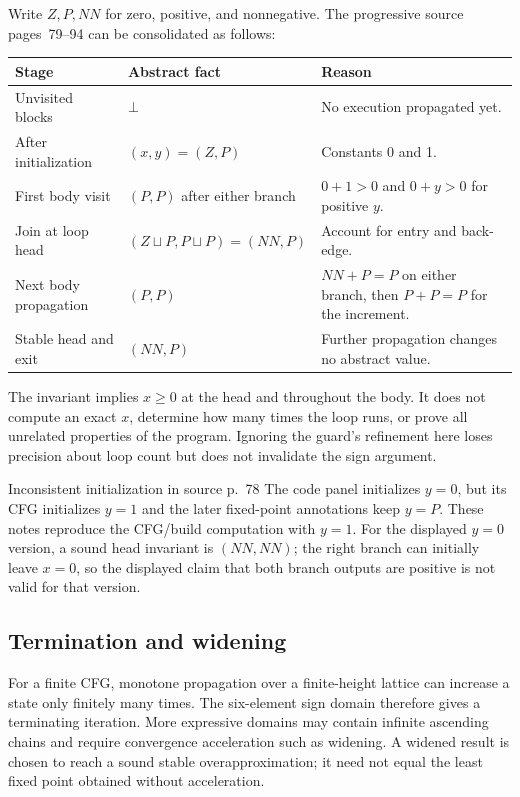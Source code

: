 \documentclass[11pt,a4paper]{article}
\numberwithin{figure}{section}
\begin{document}
Write $Z,P,NN$ for zero, positive, and nonnegative. The progressive source pages~79--94 can be consolidated as follows:
\par\noindent\begin{tabularx}{\linewidth}{@{}>{\raggedright\arraybackslash}p{30mm}>{\raggedright\arraybackslash}p{54mm}Y@{}}\toprule
Stage & Abstract fact & Reason\\\midrule
Unvisited blocks & $\bot$ & No execution propagated yet.\\
After initialization & $(x,y)=(Z,P)$ & Constants 0 and 1.\\
First body visit & $(P,P)$ after either branch & $0+1>0$ and $0+y>0$ for positive $y$.\\
Join at loop head & $(Z\sqcup P,P\sqcup P)=(NN,P)$ & Account for entry and back-edge.\\
Next body propagation & $(P,P)$ & $NN+P=P$ on either branch, then $P+P=P$ for the increment.\\
Stable head and exit & $(NN,P)$ & Further propagation changes no abstract value.\\\bottomrule
\end{tabularx}\par

The invariant implies $x\ge0$ at the head and throughout the body. It does not compute an exact $x$, determine how many times the loop runs, or prove all unrelated properties of the program. Ignoring the guard's refinement here loses precision about loop count but does not invalidate the sign argument.

\begin{correction}{Inconsistent initialization in source p.~78}
The code panel initializes $y=0$, but its CFG initializes $y=1$ and the later fixed-point annotations keep $y=P$. These notes reproduce the CFG/build computation with $y=1$. For the displayed $y=0$ version, a sound head invariant is $(NN,NN)$; the right branch can initially leave $x=0$, so the displayed claim that both branch outputs are positive is not valid for that version.
\end{correction}

\subsection{Termination and widening}
For a finite CFG, monotone propagation over a finite-height lattice can increase a state only finitely many times. The six-element sign domain therefore gives a terminating iteration. More expressive domains may contain infinite ascending chains and require convergence acceleration such as widening. A widened result is chosen to reach a sound stable overapproximation; it need not equal the least fixed point obtained without acceleration.
\end{document}
